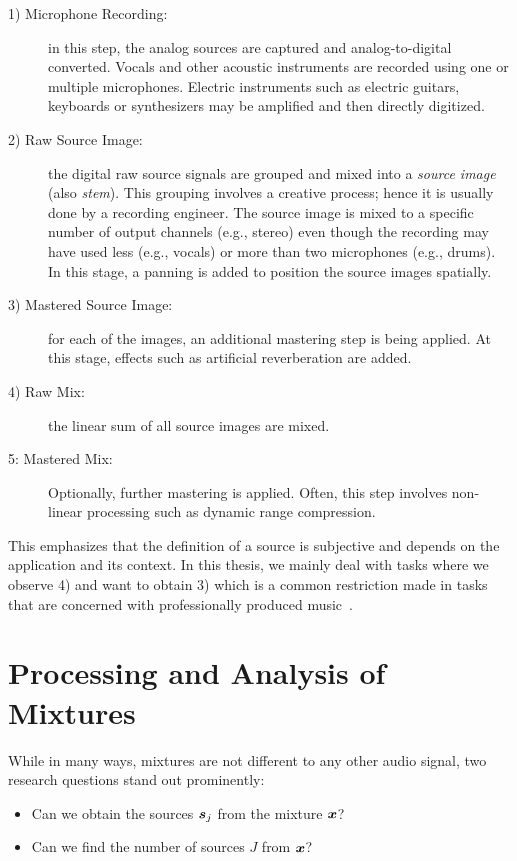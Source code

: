 \begin{description}
  \item[1) Microphone Recording:] in this step, the analog sources are captured and analog-to-digital converted. 
  Vocals and other acoustic instruments are recorded using one or multiple microphones.
  Electric instruments such as electric guitars, keyboards or synthesizers may be amplified and then directly digitized.
  \item[2) Raw Source Image:] the digital raw source signals are grouped and mixed into a \emph{source image} (also \emph{stem}).
  This grouping involves a creative process; hence it is usually done by a recording engineer.
  The source image is mixed to a specific number of output channels (e.g., stereo) even though the recording may have used less (e.g., vocals) or more than two microphones (e.g., drums).
  In this stage, a panning is added to position the source images spatially.
  \item[3) Mastered Source Image:] for each of the images, an additional mastering step is being applied.
  At this stage, effects such as artificial reverberation are added.
  \item[4) Raw Mix:] the linear sum of all source images are mixed.
  \item[5: Mastered Mix:] Optionally, further mastering is applied.
  Often, this step involves non-linear processing such as dynamic range compression.
\end{description}

This emphasizes that the definition of a source is subjective and depends on the application and its context. In this thesis, we mainly deal with tasks where we observe 4) and want to obtain 3) which is a common restriction made in tasks that are concerned with professionally produced music~\cite{sturmel12}.

\hypertarget{processing-and-analysis-of-mixtures}{%
\section{Processing and Analysis of Mixtures}\label{sec:processing-and-analysis-of-mixtures}}

While in many ways, mixtures are not different to any other audio signal, two research questions stand out prominently:

\begin{itemize}
    \item Can we obtain the sources \({\bm{s}}_j\) from the mixture \({\bm{x}}\)? 
    \item Can we find the number of sources \(J\) from \({\bm{x}}\)?
\end{itemize}

